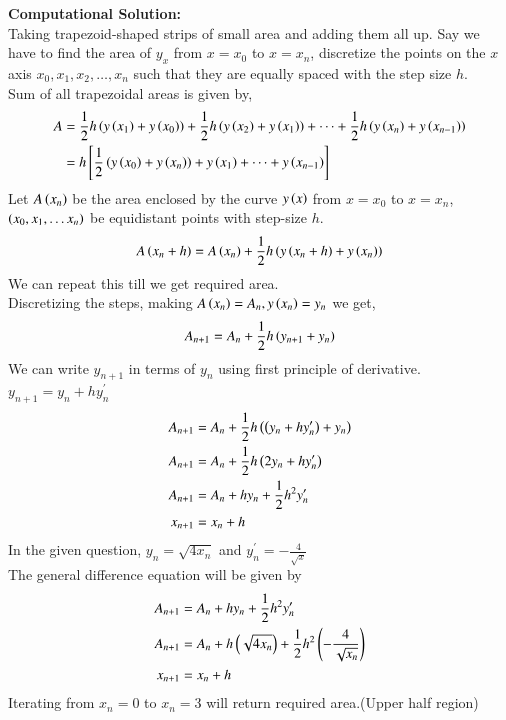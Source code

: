 \documentclass[journal]{IEEEtran}
\begin{document}
\textbf{Computational Solution:}\\

Taking trapezoid-shaped strips of small area and adding them all up. Say we have to find the area of $y_{x}$ from $x=x_0$ to $x=x_n$, discretize the points on the $x$ axis $x_0, x_1, x_2, \dots, x_n$ such that they are equally spaced with the step size $h$. \\
Sum of all trapezoidal areas is given by,
\begin{align}
  A&=\frac{1}{2}h\left(y\left(x_1\right)+y\left(x_0\right)\right)+ \frac{1}{2}h\left(y\left(x_2\right)+y\left(x_1\right)\right)+\dots+\frac{1}{2}h\left(y\left(x_n\right)+y\left(x_{n-1}\right)\right)\\
  &=h{}\left[\frac{1}{2}\left(y\left(x_0\right)+y\left(x_n\right)\right)+ y\left(x_1\right)+\dots+y\left(x_{n-1}\right)\right]
\end{align}
Let $A\left(x_n\right)$ be the area enclosed by the curve $y\left(x\right)$ from $x=x_0$ to $x=x_n$, $\left(x_0, x_1, \dots x_n\right)$ be equidistant points with step-size $h$.
\begin{align}
  A\left(x_n+h\right)=A\left(x_n\right)+\frac{1}{2}h\left(y\left(x_n+h\right)+y\left(x_n\right)\right)
\end{align}
We can repeat this till we get required area.\\
Discretizing the steps, making $A\left(x_n\right)=A_n, y\left(x_n\right)=y_n$ we get,
\begin{align}
 A_{n+1}=A_n+\frac{1}{2}h\left(y_{n+1}+y_n\right)
\end{align}
We can write $y_{n+1}$ in terms of $y_n$ using first principle of derivative. $y_{n+1}=y_n+hy^{\prime}_n$
\begin{align}
  A_{n+1}&=A_n+\frac{1}{2}h\left(\left(y_{n}+hy^{\prime}_n\right)+y_n\right)\\
  A_{n+1}&=A_n+\frac{1}{2}h\left(2y_n+hy^{\prime}_n\right)\\
  A_{n+1}&=A_n+hy_n+\frac{1}{2}h^2y^{\prime}_n\\
  x_{n+1}&=x_n+h
\end{align}
In the given question, $y_n=\sqrt{4x_n} $ and $y^{\prime}_n= -\frac{4}{\sqrt{x}}$\\
The general difference equation will be given by
\begin{align}
  A_{n+1}&=A_n+hy_n+\frac{1}{2}h^2y^{\prime}_n\\
  A_{n+1}&=A_n+h\left(\sqrt{4x_n} \right)+\frac{1}{2}h^2\left(-\frac{4}{\sqrt{x_n}}\right)\\
  x_{n+1}&=x_n+h
\end{align}
Iterating from $x_n=0$ to $x_n=3$ will return required area.(Upper half region) \\
\end{document}
